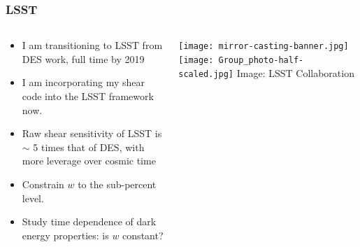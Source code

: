 \documentclass{beamer}
\begin{document}
\frame
{
    \frametitle{LSST}

    \begin{columns}
        \begin{column}{0.5\textwidth}    

            \begin{itemize}

                \item I am transitioning to LSST from DES work, full time by
                    2019

                \item I am incorporating my shear code into the LSST framework
                    now. 

                \item Raw shear sensitivity of LSST is $\sim$ 5 times that of
                    DES, {\color{gold} with more leverage over cosmic time}

                \item Constrain  {\color{gold} $w$} to the sub-percent level.

                \item Study time dependence of dark energy properties: is {\color{gold} $w$ } constant?

            \end{itemize}
        \end{column}
        \begin{column}{0.5\textwidth}    
            \texttt{[image: mirror-casting-banner.jpg]}
            \newline
            \vspace{2mm}
            \texttt{[image: Group\_photo-half-scaled.jpg]}
            \newline
            \hfill {\tiny Image: LSST Collaboration}
        \end{column}
    \end{columns}
}
\end{document}
